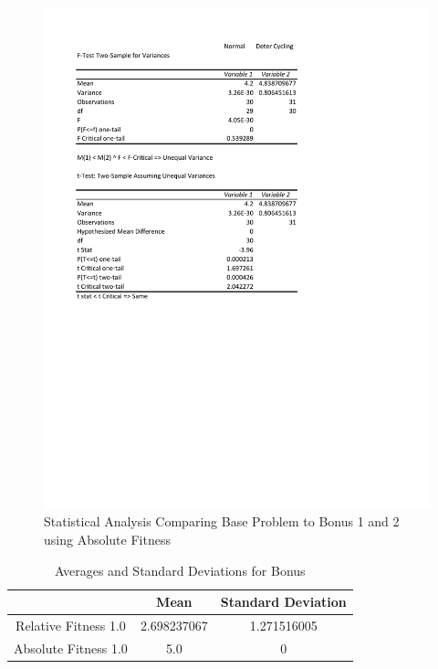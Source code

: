 \documentclass[times]{article}
\begin{document}
	\begin{figure}
		\caption{Statistical Analysis Comparing Base Problem to Bonus 1 and 2 using Absolute Fitness}
		\label{fig:stat_abs_bonus}
		\includegraphics[width=\textwidth]{./pictures/stat_abs_bonus.pdf}
	\end{figure}

	\begin{table}
		\centering
		\caption{Averages and Standard Deviations for Bonus}
		\label{tab:std_mean_bonus}
		\begin{tabular}{| c | c | c |}
			\hline
									& Mean 		& Standard Deviation 	\\
			\hline
			Relative Fitness 1.0	& 2.698237067 & 1.271516005			\\
			\hline
			Absolute Fitness 1.0	& 5.0		 & 0					\\
			\hline
		\end{tabular}
	\end{table}
		
\end{document}
